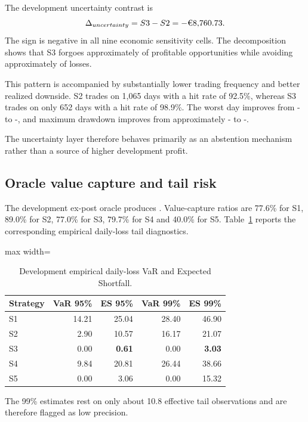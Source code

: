 The development uncertainty contrast is
\[
\Delta_{uncertainty}=S3-S2=-\EUR{8,760.73}.
\]
The sign is negative in all nine economic sensitivity cells. The decomposition shows that S3 forgoes approximately  of profitable opportunities while avoiding approximately  of losses.

This pattern is accompanied by substantially lower trading frequency and better realized downside. S2 trades on 1,065 days with a hit rate of 92.5\%, whereas S3 trades on only 652 days with a hit rate of 98.9\%. The worst day improves from - to -, and maximum drawdown improves from approximately - to -.

The uncertainty layer therefore behaves primarily as an abstention mechanism rather than a source of higher development profit.

\subsection{Oracle value capture and tail risk}

The development ex-post oracle produces . Value-capture ratios are 77.6\% for S1, 89.0\% for S2, 77.0\% for S3, 79.7\% for S4 and 40.0\% for S5. Table~\ref{tab:dev_tailrisk} reports the corresponding empirical daily-loss tail diagnostics.

\begin{table}[htbp]
\centering
\caption{Development empirical daily-loss VaR and Expected Shortfall.}
\label{tab:dev_tailrisk}
\begin{adjustbox}{max width=\textwidth}
\begin{tabular}{lrrrr}
\toprule
Strategy & VaR 95\% & ES 95\% & VaR 99\% & ES 99\% \\
\midrule
S1 & 14.21 & 25.04 & 28.40 & 46.90 \\
S2 & 2.90 & 10.57 & 16.17 & 21.07 \\
S3 & 0.00 & \textbf{0.61} & 0.00 & \textbf{3.03} \\
S4 & 9.84 & 20.81 & 26.44 & 38.66 \\
S5 & 0.00 & 3.06 & 0.00 & 15.32 \\
\bottomrule
\end{tabular}
\end{adjustbox}
\end{table}

The 99\% estimates rest on only about 10.8 effective tail observations and are therefore flagged as low precision.

